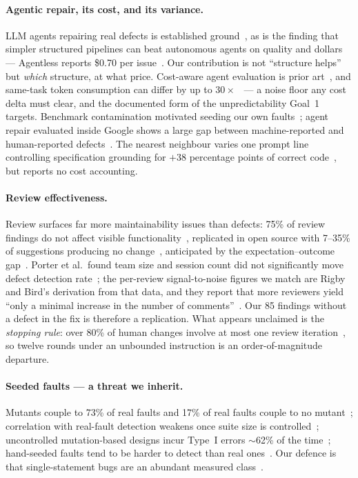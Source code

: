 \documentclass[runningheads]{llncs}
\begin{document}
\paragraph{Agentic repair, its cost, and its variance.} LLM agents repairing
real defects is established ground~\cite{jimenez2024,yang2024,xia2023}, as is
the finding that simpler structured pipelines can beat autonomous agents on
quality and dollars --- Agentless reports \$0.70 per issue~\cite{xia2024}.
Our contribution is not ``structure helps'' but \emph{which} structure, at
what price. Cost-aware agent evaluation is prior art~\cite{kapoor2024}, and
same-task token consumption can differ by up to $30\times$~\cite{bai2026}
--- a noise floor any cost delta must clear, and the documented form of the
unpredictability Goal~1 targets. Benchmark contamination motivated seeding
our own faults~\cite{aleithan2024}; agent repair evaluated inside Google
shows a large gap between machine-reported and human-reported
defects~\cite{rondon2025}. The nearest neighbour varies one prompt line
controlling specification grounding for $+38$ percentage points of correct
code~\cite{haeri2026}, but reports no cost accounting.

\paragraph{Review effectiveness.} Review surfaces far more maintainability
issues than defects: 75\% of review findings do not affect visible
functionality~\cite{mantyla2009}, replicated in open source with 7--35\% of
suggestions producing no change~\cite{beller2014}, anticipated by the
expectation--outcome gap~\cite{bacchelli2013}. Porter et al.\ found team size
and session count did not significantly move defect detection
rate~\cite{porter1998}; the per-review signal-to-noise figures we match are
Rigby and Bird's derivation from that data, and they report that more
reviewers yield ``only a minimal increase in the number of
comments''~\cite{rigby2013}. Our 85 findings without a defect in the fix is
therefore a replication. What appears unclaimed is the \emph{stopping rule}:
over 80\% of human changes involve at most one review
iteration~\cite{sadowski2018}, so twelve rounds under an unbounded
instruction is an order-of-magnitude departure.

\paragraph{Seeded faults --- a threat we inherit.} Mutants couple to 73\% of
real faults and 17\% of real faults couple to no mutant~\cite{just2014};
correlation with real-fault detection weakens once suite size is
controlled~\cite{papadakis2018}; uncontrolled mutation-based designs incur
Type~I errors $\sim$62\% of the time~\cite{papadakis2016}; hand-seeded faults
tend to be harder to detect than real ones~\cite{andrews2005}. Our defence is
that single-statement bugs are an abundant measured
class~\cite{karampatsis2020}.
\end{document}
